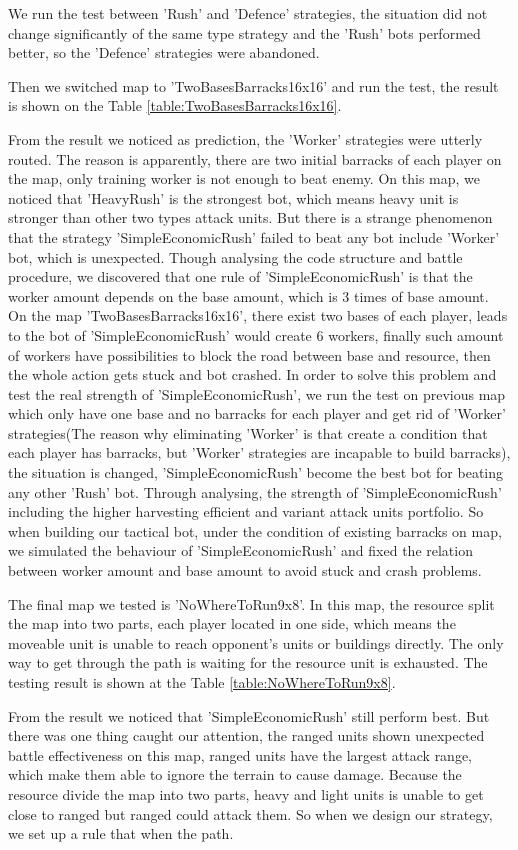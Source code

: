 We run the test between 'Rush' and 'Defence' strategies, the situation did not change significantly
of the same type strategy and the 'Rush' bots performed better, so the 'Defence' strategies were abandoned.

Then we switched map to 'TwoBasesBarracks16x16' and run the test, the result is shown on the
Table \ref{table:TwoBasesBarracks16x16}.



From the result we noticed as prediction, the 'Worker' strategies were utterly routed. The reason is
apparently, there are two initial barracks of each player on the map, only training worker is not enough
to beat enemy. On this map, we noticed that 'HeavyRush' is the strongest bot, which means heavy unit is
stronger than other two types attack units. But there is a strange phenomenon that the strategy
'SimpleEconomicRush' failed to beat any bot include 'Worker' bot, which is unexpected. Though analysing
the code structure and battle procedure, we discovered that one rule of 'SimpleEconomicRush' is that the
worker amount depends on the base amount, which is 3 times of base amount. On the map 'TwoBasesBarracks16x16',
there exist two bases of each player, leads to the bot of 'SimpleEconomicRush' would create 6 workers,
finally such amount of workers have possibilities to block the road between base and resource, then the
whole action gets stuck and bot crashed. In order to solve this problem and test the real strength of
'SimpleEconomicRush', we run the test on previous map which only have one base and no barracks for each
player and get rid of 'Worker' strategies(The reason why eliminating 'Worker' is that create a condition
that each player has barracks, but 'Worker' strategies are incapable to build barracks), the situation is
changed, 'SimpleEconomicRush' become the best bot for beating any other 'Rush' bot. Through analysing, the
strength of 'SimpleEconomicRush' including the higher harvesting efficient and variant attack units portfolio.
So when building our tactical bot, under the condition of existing barracks on map, we simulated the
behaviour of 'SimpleEconomicRush' and fixed the relation between worker amount and base amount to avoid
stuck and crash problems.

The final map we tested is 'NoWhereToRun9x8'. In this map, the resource split the map into two parts,
each player located in one side, which means the moveable unit is unable to reach opponent's units or
buildings directly. The only way to get through the path is waiting for the resource unit is exhausted.
The testing result is shown at the Table \ref{table:NoWhereToRun9x8}.



From the result we noticed that 'SimpleEconomicRush' still perform best. But there was one thing caught
our attention, the ranged units shown unexpected battle effectiveness on this map, ranged units have the
largest attack range, which make them able to ignore the terrain to cause damage. Because the resource
divide the map into two parts, heavy and light units is unable to get close to ranged but ranged could
attack them. So when we design our strategy, we set up a rule that when the path.
